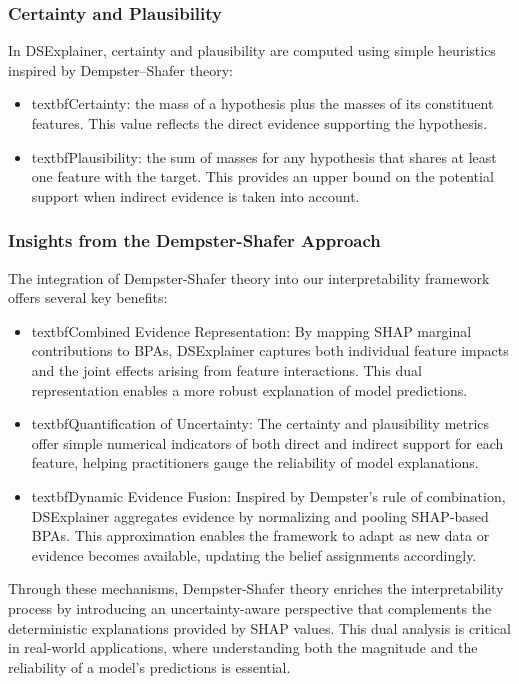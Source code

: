\documentclass[acmlarge]{acmart}
\begin{document}
\subsubsection{Certainty and Plausibility}

In DSExplainer, certainty and plausibility are computed using simple heuristics inspired by Dempster--Shafer theory:
\begin{itemize}
    \item textbf{Certainty}: the mass of a hypothesis plus the masses of its constituent features. This value reflects the direct evidence supporting the hypothesis.
    \item textbf{Plausibility}: the sum of masses for any hypothesis that shares at least one feature with the target. This provides an upper bound on the potential support when indirect evidence is taken into account.
\end{itemize}



\subsubsection{Insights from the Dempster-Shafer Approach}

The integration of Dempster-Shafer theory into our interpretability framework offers several key benefits:
\begin{itemize}
    \item textbf{Combined Evidence Representation:} By mapping SHAP marginal contributions to BPAs, DSExplainer captures both individual feature impacts and the joint effects arising from feature interactions. This dual representation enables a more robust explanation of model predictions.
    \item textbf{Quantification of Uncertainty:} The certainty and plausibility metrics offer simple numerical indicators of both direct and indirect support for each feature, helping practitioners gauge the reliability of model explanations.
    \item textbf{Dynamic Evidence Fusion:} Inspired by Dempster's rule of combination, DSExplainer aggregates evidence by normalizing and pooling SHAP-based BPAs. This approximation enables the framework to adapt as new data or evidence becomes available, updating the belief assignments accordingly.

\end{itemize}

Through these mechanisms, Dempster-Shafer theory enriches the interpretability process by introducing an uncertainty-aware perspective that complements the deterministic explanations provided by SHAP values. This dual analysis is critical in real-world applications, where understanding both the magnitude and the reliability of a model’s predictions is essential.
\end{document}
